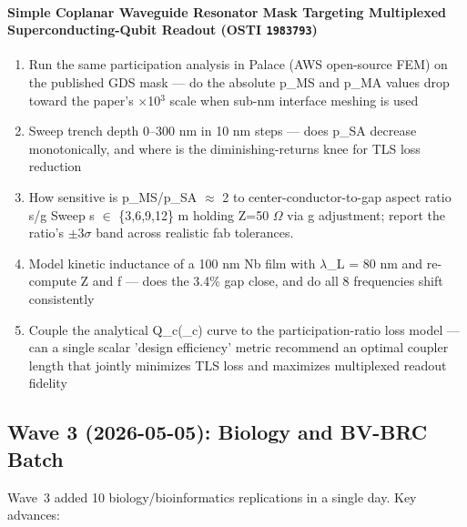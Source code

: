 \documentclass[11pt]{article}
\begin{document}
\paragraph{Simple Coplanar Waveguide Resonator Mask Targeting Multiplexed Superconducting-Qubit Readout \textnormal{\small(OSTI \texttt{1983793})}}
\begin{enumerate}[leftmargin=1.6em,itemsep=0.2em,topsep=0.2em,label=Q\arabic*.]
\item Run the same participation analysis in Palace (AWS open-source FEM) on the published GDS mask --- do the absolute p\_MS and p\_MA values drop toward the paper's $\times$10$^3$ scale when sub-nm interface meshing is used
\item Sweep trench depth 0--300 nm in 10 nm steps --- does p\_SA decrease monotonically, and where is the diminishing-returns knee for TLS loss reduction
\item How sensitive is p\_MS/p\_SA $\approx$ 2 to center-conductor-to-gap aspect ratio s/g Sweep s $\in$ \{3,6,9,12\} m holding Z=50 $\Omega$ via g adjustment; report the ratio's $\pm$3$\sigma$ band across realistic fab tolerances.
\item Model kinetic inductance of a 100 nm Nb film with $\lambda$\_L = 80 nm and re-compute Z and f --- does the 3.4\% gap close, and do all 8 frequencies shift consistently
\item Couple the analytical Q\_c(\_c) curve to the participation-ratio loss model --- can a single scalar 'design efficiency' metric recommend an optimal coupler length that jointly minimizes TLS loss and maximizes multiplexed readout fidelity
\end{enumerate}

\subsection{Wave 3 (2026-05-05): Biology and BV-BRC Batch}
Wave~3 added 10 biology/bioinformatics replications in a single day. Key
advances:
\end{document}
